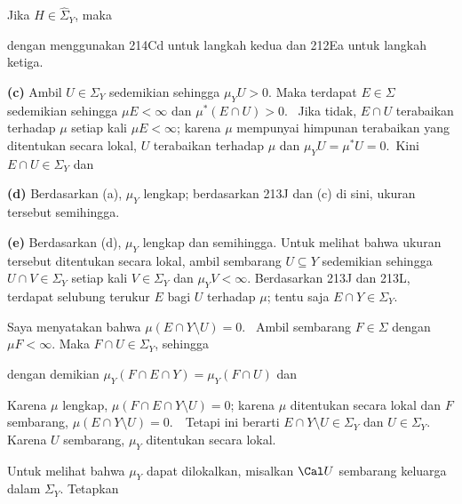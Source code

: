 {\noindent Jika $H\in\hat\Sigma_Y$, maka


\noindent dengan menggunakan 214Cd untuk langkah kedua dan 212Ea untuk
langkah ketiga.

\medskip

{\bf (c)} Ambil $U\in\Sigma_Y$ sedemikian sehingga $\mu_YU>0$.   Maka
terdapat $E\in\Sigma$ sedemikian sehingga $\mu E<\infty$ dan
$\mu^*(E\cap U)>0$.   \Prf\Quer\ Jika tidak, $E\cap U$ terabaikan
terhadap $\mu$ setiap kali $\mu E<\infty$; karena $\mu$ mempunyai
himpunan terabaikan yang ditentukan secara lokal, $U$ terabaikan terhadap
$\mu$ dan $\mu_YU=\mu^*U=0$.\ \Bang\QeD   Kini
$E\cap U\in\Sigma_Y$ dan


\medskip

{\bf (d)} Berdasarkan (a), $\mu_Y$ lengkap; berdasarkan 213J dan (c) di
sini, ukuran tersebut semihingga.

\medskip

{\bf (e)} Berdasarkan (d), $\mu_Y$ lengkap dan semihingga. Untuk melihat
bahwa ukuran tersebut ditentukan secara lokal, ambil sembarang $U\subseteq Y$
sedemikian sehingga $U\cap V\in\Sigma_Y$ setiap kali $V\in\Sigma_Y$ dan
$\mu_YV<\infty$.   Berdasarkan 213J dan 213L, terdapat selubung terukur
$E$ bagi $U$ terhadap $\mu$; tentu saja $E\cap Y\in\Sigma_Y$.

Saya menyatakan bahwa $\mu(E\cap Y\setminus U)=0$.   \Prf\ Ambil
sembarang $F\in\Sigma$ dengan $\mu F<\infty$.   Maka
$F\cap U\in\Sigma_Y$, sehingga

\noindent dengan demikian $\mu_Y(F\cap E\cap Y)=\mu_Y(F\cap U)$ dan


\noindent Karena $\mu$ lengkap, $\mu(F\cap E\cap Y\setminus U)=0$;
karena $\mu$ ditentukan secara lokal dan $F$ sembarang,
$\mu(E\cap Y\setminus U)=0$.\ \QeD\  Tetapi ini berarti
$E\cap Y\setminus U\in\Sigma_Y$ dan $U\in\Sigma_Y$.   Karena $U$
sembarang, $\mu_Y$ ditentukan secara lokal.

Untuk melihat bahwa $\mu_Y$ dapat dilokalkan, misalkan $\Cal U$
sembarang keluarga dalam $\Sigma_Y$.   Tetapkan


}
